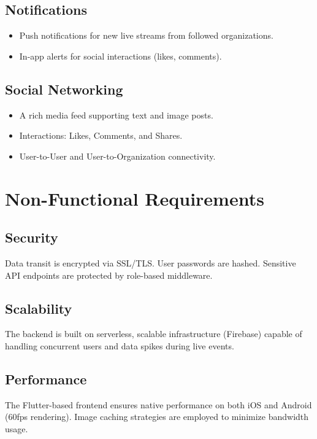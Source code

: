 \documentclass[12pt, a4paper]{report}
\begin{document}
\section{Notifications}
\begin{itemize}
    \item Push notifications for new live streams from followed organizations.
    \item In-app alerts for social interactions (likes, comments).
\end{itemize}

\section{Social Networking}
\begin{itemize}
    \item A rich media feed supporting text and image posts.
    \item Interactions: Likes, Comments, and Shares.
    \item User-to-User and User-to-Organization connectivity.
\end{itemize}

\chapter{Non-Functional Requirements}

\section{Security}
Data transit is encrypted via SSL/TLS. User passwords are hashed. Sensitive API endpoints are protected by role-based middleware.

\section{Scalability}
The backend is built on serverless, scalable infrastructure (Firebase) capable of handling concurrent users and data spikes during live events.

\section{Performance}
The Flutter-based frontend ensures native performance on both iOS and Android (60fps rendering). Image caching strategies are employed to minimize bandwidth usage.
\end{document}
